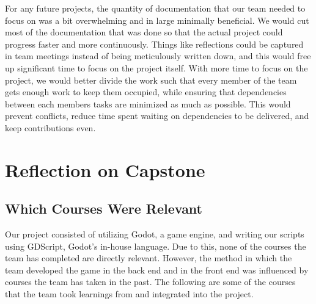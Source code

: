 \documentclass{article}
\begin{document}

For any future projects, the quantity of documentation that our team needed to focus on was a bit overwhelming and in large minimally beneficial. We would cut most of the documentation that was done so that the actual project could progress faster and more continuously. Things like reflections could be captured in team meetings instead of being meticulously written down, and this would free up significant time to focus on the project itself. With more time to focus on the project, we would better divide the work such that every member of the team gets enough work to keep them occupied, while ensuring that dependencies between each members tasks are minimized as much as possible. This would prevent conflicts, reduce time spent waiting on dependencies to be delivered, and keep contributions even.

\section{Reflection on Capstone}


\subsection{Which Courses Were Relevant}


Our project consisted of utilizing Godot, a game engine, and writing our scripts using GDScript, Godot's in-house language. Due to this, none of the courses the team has completed are directly relevant. However, the method in which the team developed the game in the back end and in the front end was influenced by courses the team has taken in the past. The following are some of the courses that the team took learnings from and integrated into the project. 
\end{document}
